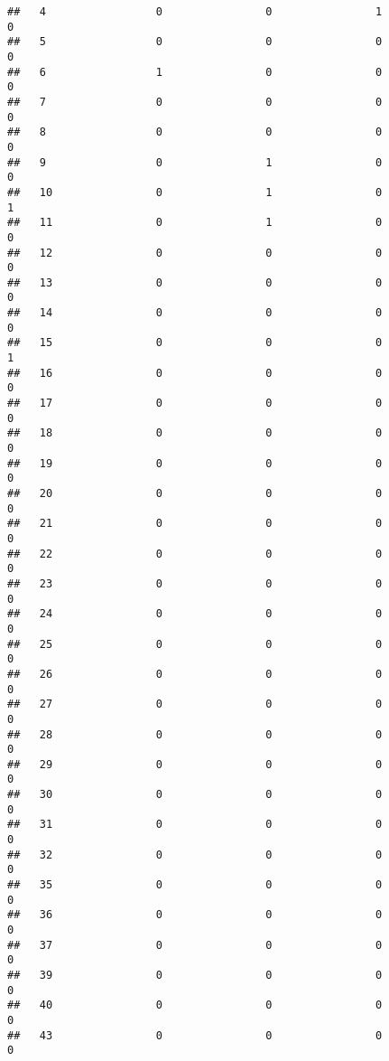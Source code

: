 \documentclass[]{article}
\begin{document}
\begin{verbatim}
##   4                 0                0                1                0
##   5                 0                0                0                0
##   6                 1                0                0                0
##   7                 0                0                0                0
##   8                 0                0                0                0
##   9                 0                1                0                0
##   10                0                1                0                1
##   11                0                1                0                0
##   12                0                0                0                0
##   13                0                0                0                0
##   14                0                0                0                0
##   15                0                0                0                1
##   16                0                0                0                0
##   17                0                0                0                0
##   18                0                0                0                0
##   19                0                0                0                0
##   20                0                0                0                0
##   21                0                0                0                0
##   22                0                0                0                0
##   23                0                0                0                0
##   24                0                0                0                0
##   25                0                0                0                0
##   26                0                0                0                0
##   27                0                0                0                0
##   28                0                0                0                0
##   29                0                0                0                0
##   30                0                0                0                0
##   31                0                0                0                0
##   32                0                0                0                0
##   35                0                0                0                0
##   36                0                0                0                0
##   37                0                0                0                0
##   39                0                0                0                0
##   40                0                0                0                0
##   43                0                0                0                0

\end{verbatim}
\end{document}
